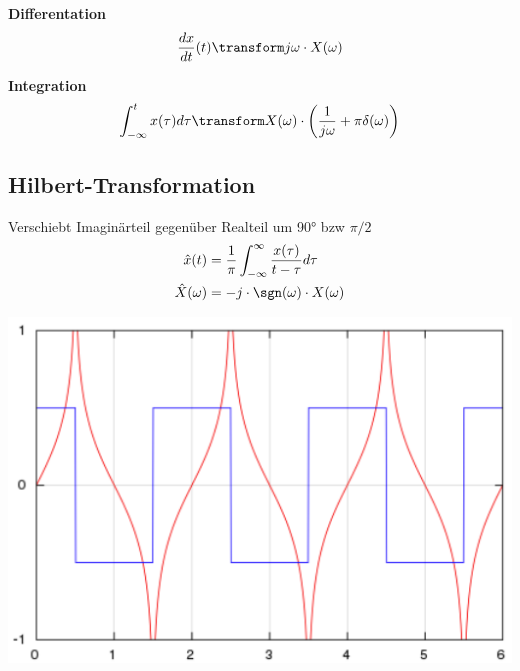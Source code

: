 \noindent\textbf{Differentation}
\begin{align*}
	\frac{dx}{dt}(t) \transform j\omega \cdot X(\omega)
\end{align*}

\noindent\textbf{Integration}
\begin{align*}
	\int_{-\infty}^{t}x(\tau)d\tau \transform X(\omega)\cdot \left(\frac{1}{j\omega} + \pi \delta(\omega)\right)
\end{align*}


\subsection{Hilbert-Transformation}
Verschiebt Imaginärteil gegenüber Realteil um 90° bzw $\pi/2$ 
\begin{align*}
	\hat{x}(t) &= \frac{1}{\pi}\int_{-\infty}^{\infty}\frac{x(\tau)}{t - \tau}d\tau \\
	\hat{X}(\omega) &= -j \cdot \sgn(\omega) \cdot X(\omega)
\end{align*}

\begin{center}
	\includegraphics[width=0.6\columnwidth]{Images/hilbert}
\end{center}
